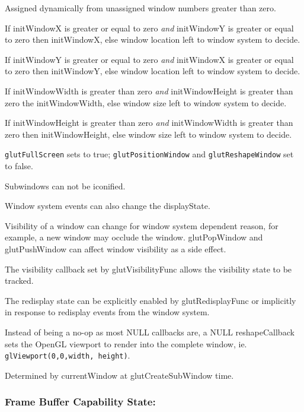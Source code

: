 \resetNote

{\footnotesize
\begin{description}
\itemsep 0in
\item[\takeNote]  Assigned dynamically from unassigned window numbers greater than zero.
\item[\takeNote]  If initWindowX is greater or equal to zero {\em and}
initWindowY is greater or equal to zero then initWindowX, else
window location left to window system to decide.
\item[\takeNote]  If initWindowY is greater or equal to zero {\em and}
initWindowX is greater or equal to zero then initWindowY, else
window location left to window system to decide.
\item[\takeNote]  If initWindowWidth is greater than zero {\em and} initWindowHeight is greater than zero
the initWindowWidth, else
window size left to window system to decide.
\item[\takeNote]  If initWindowHeight is greater than zero {\em and} initWindowWidth is greater than zero
then initWindowHeight, else
window size left to window system to decide.
\item[\takeNote]  {\tt glutFullScreen} sets to true; {\tt glutPositionWindow} and
{\tt glutReshapeWindow} set to false.
\item[\takeNote]  Subwindows can not be iconified.
\item[\takeNote]  Window system events can also change the displayState.
\item[\takeNote]  Visibility of a window can change for window system dependent reason, for
  example, a new window may occlude the window.  glutPopWindow and glutPushWindow can
  affect window visibility as a side effect.
\item[\takeNote]  The visibility callback set by glutVisibilityFunc allows the visibility state to be tracked.
\item[\takeNote]  The redisplay state can be explicitly enabled by glutRedisplayFunc or
  implicitly in response to redisplay events from the window system.
\item[\takeNote]  Instead of being a no-op as most NULL callbacks are, a NULL reshapeCallback
sets the OpenGL viewport to render into the complete window, ie. {\tt glViewport(0,0,width, height)}.
\item[\takeNote]  Determined by currentWindow at glutCreateSubWindow time.
\end{description}
}

\subsubsection{Frame Buffer Capability State:}

